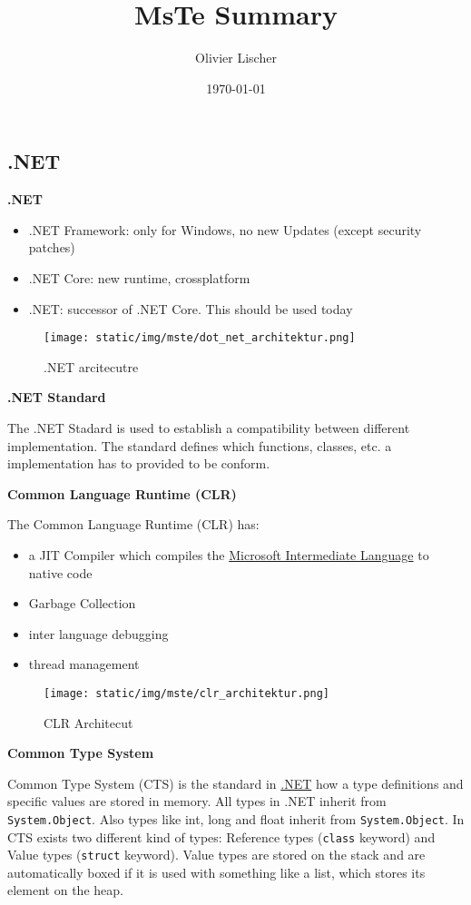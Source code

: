 \documentclass[11pt,twoside,landscape]{article}
\author{Olivier Lischer}
\date{\today}
\title{MsTe Summary}
\begin{document}
\pagestyle{fancy}
\fancyhf{}
\fancyfoot[CE,CO]{\leftmark}
\fancyfoot[R]{\thepage}
\begin{multicols}{3}

\section{.NET}
\label{sec:orgba682fe}
\textbf{.NET}

\begin{itemize}
\item .NET Framework: only for Windows, no new Updates (except security patches)
\item .NET Core: new runtime, crossplatform
\item .NET: successor of .NET Core. This should be used today
\end{itemize}

\begin{figure}[htbp]
\centering
\texttt{[image: static/img/mste/dot\_net\_architektur.png]}
\caption{\label{fig:org7820452}.NET arcitecutre}
\end{figure}

\textbf{.NET Standard}

The .NET Stadard is used to establish a compatibility between different implementation.
The standard defines which functions, classes, etc. a implementation has to provided to be conform. 

\textbf{Common Language Runtime (CLR)}

The Common Language Runtime (CLR) has:
\begin{itemize}
\item a JIT Compiler which compiles the \href{../../../roam/20211003114528-microsoft_intermediate_language.org}{Microsoft Intermediate Language} to native code
\item Garbage Collection
\item inter language debugging
\item thread management
\end{itemize}


\begin{figure}[htbp]
\centering
\texttt{[image: static/img/mste/clr\_architektur.png]}
\caption{\label{fig:org1ef2918}CLR Architecut}
\end{figure}

\textbf{Common Type System}

Common Type System (CTS) is the standard in \href{../../../roam/20211003114703-net.org}{.NET} how a type definitions and specific values are stored in memory.
All types in .NET inherit from \texttt{System.Object}. Also types like int, long and float inherit from \texttt{System.Object}. In CTS exists two different kind of types: Reference types (\texttt{class} keyword) and Value types (\texttt{struct} keyword). Value types are stored on the stack and are automatically boxed if it is used with something like a list, which stores its  element on the heap. 


\end{multicols}
\end{document}
